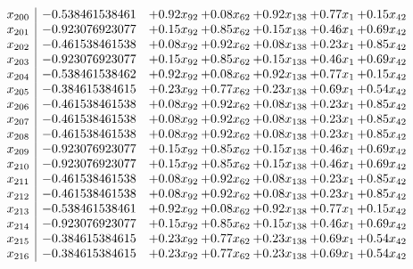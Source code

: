 \documentclass[8pt]{article}
\begin{document}
\[\begin{array}{c| c c@{\hskip 2pt} c@{\hskip 2pt} c@{\hskip 2pt} c@{\hskip 2pt} c@{\hskip 2pt} }
 x_{200}   &  -0.538461538461 & +  0.92 x_{92} & +  0.08 x_{62} & +  0.92 x_{138} & +  0.77 x_{1} & +  0.15 x_{42}\\
 x_{201}   &  -0.923076923077 & +  0.15 x_{92} & +  0.85 x_{62} & +  0.15 x_{138} & +  0.46 x_{1} & +  0.69 x_{42}\\
 x_{202}   &  -0.461538461538 & +  0.08 x_{92} & +  0.92 x_{62} & +  0.08 x_{138} & +  0.23 x_{1} & +  0.85 x_{42}\\
 x_{203}   &  -0.923076923077 & +  0.15 x_{92} & +  0.85 x_{62} & +  0.15 x_{138} & +  0.46 x_{1} & +  0.69 x_{42}\\
 x_{204}   &  -0.538461538462 & +  0.92 x_{92} & +  0.08 x_{62} & +  0.92 x_{138} & +  0.77 x_{1} & +  0.15 x_{42}\\
 x_{205}   &  -0.384615384615 & +  0.23 x_{92} & +  0.77 x_{62} & +  0.23 x_{138} & +  0.69 x_{1} & +  0.54 x_{42}\\
 x_{206}   &  -0.461538461538 & +  0.08 x_{92} & +  0.92 x_{62} & +  0.08 x_{138} & +  0.23 x_{1} & +  0.85 x_{42}\\
 x_{207}   &  -0.461538461538 & +  0.08 x_{92} & +  0.92 x_{62} & +  0.08 x_{138} & +  0.23 x_{1} & +  0.85 x_{42}\\
 x_{208}   &  -0.461538461538 & +  0.08 x_{92} & +  0.92 x_{62} & +  0.08 x_{138} & +  0.23 x_{1} & +  0.85 x_{42}\\
 x_{209}   &  -0.923076923077 & +  0.15 x_{92} & +  0.85 x_{62} & +  0.15 x_{138} & +  0.46 x_{1} & +  0.69 x_{42}\\
 x_{210}   &  -0.923076923077 & +  0.15 x_{92} & +  0.85 x_{62} & +  0.15 x_{138} & +  0.46 x_{1} & +  0.69 x_{42}\\
 x_{211}   &  -0.461538461538 & +  0.08 x_{92} & +  0.92 x_{62} & +  0.08 x_{138} & +  0.23 x_{1} & +  0.85 x_{42}\\
 x_{212}   &  -0.461538461538 & +  0.08 x_{92} & +  0.92 x_{62} & +  0.08 x_{138} & +  0.23 x_{1} & +  0.85 x_{42}\\
 x_{213}   &  -0.538461538461 & +  0.92 x_{92} & +  0.08 x_{62} & +  0.92 x_{138} & +  0.77 x_{1} & +  0.15 x_{42}\\
 x_{214}   &  -0.923076923077 & +  0.15 x_{92} & +  0.85 x_{62} & +  0.15 x_{138} & +  0.46 x_{1} & +  0.69 x_{42}\\
 x_{215}   &  -0.384615384615 & +  0.23 x_{92} & +  0.77 x_{62} & +  0.23 x_{138} & +  0.69 x_{1} & +  0.54 x_{42}\\
 x_{216}   &  -0.384615384615 & +  0.23 x_{92} & +  0.77 x_{62} & +  0.23 x_{138} & +  0.69 x_{1} & +  0.54 x_{42}\\

\end{array}\]
\end{document}
